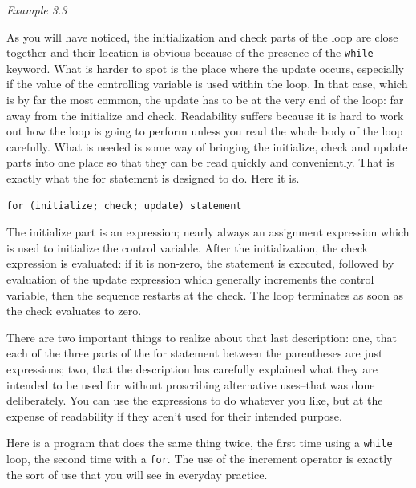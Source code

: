    \begin{center}\textit{Example 3.3}\end{center}


   As you will have noticed, the initialization and check parts of the loop
    are close together and their location is obvious because of the presence
    of the \texttt{while} keyword. What is harder to spot is the place
    where the update occurs, especially if the value of the controlling
    variable is used within the loop. In that case, which is by far the most
    common, the update has to be at the very end of the loop: far away from
    the initialize and check. Readability suffers because it is hard to work
    out how the loop is going to perform unless you read the whole body of the
    loop carefully. What is needed is some way of bringing the initialize,
    check and update parts into one place so that they can be read quickly and
    conveniently. That is exactly what the for statement is designed to do.
    Here it is.


   \begin{Verbatim}
for (initialize; check; update) statement
\end{Verbatim}

   The initialize part is an expression; nearly always an
    assignment expression which is used to initialize the control variable.
    After the initialization, the check expression is evaluated: if
    it is non-zero, the statement is executed, followed by evaluation of the
    update expression which generally increments the control variable, then
    the sequence restarts at the check. The loop terminates as soon as the
    check evaluates to zero.


   There are two important things to realize about that last description:
    one, that each of the three parts of the for statement between the
    parentheses are just expressions; two, that the description has carefully
    explained what they are intended to be used for without proscribing
    alternative uses--that was done deliberately. You can use the
    expressions to do whatever you like, but at the expense of readability if
    they aren't used for their intended purpose.


   Here is a program that does the same thing twice, the first time using a
    \texttt{while} loop, the second time with a \texttt{for}. The use
    of the increment operator is exactly the sort of use that you will see in
    everyday practice.


